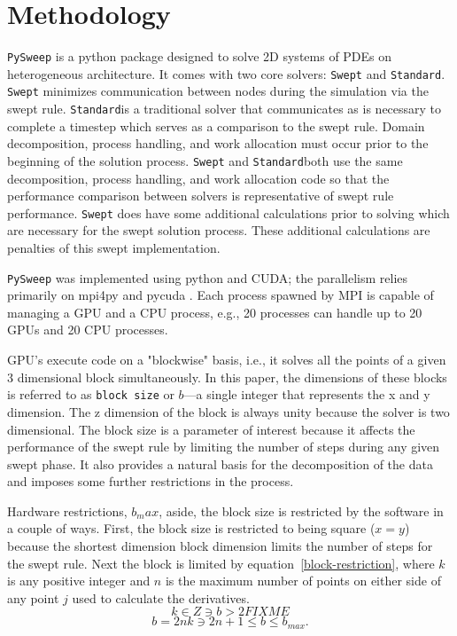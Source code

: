 \documentclass[review]{elsarticle}
\def\pysweep{\texttt{PySweep}}
\def\Swept{\texttt{Swept}}
\def\Standard{\texttt{Standard}}
\begin{document}
%
%

\section{Methodology}
\pysweep{} is a python package designed to solve 2D systems of PDEs on heterogeneous architecture. It comes with two core solvers: \Swept{} and \Standard{}. \Swept{} minimizes communication between nodes during the simulation via the swept rule. \Standard is a traditional solver that communicates as is necessary to complete a timestep which serves as a comparison to the swept rule. Domain decomposition, process handling, and work allocation must occur prior to the beginning of the solution process. \Swept{} and \Standard both use the same decomposition, process handling, and work allocation code so that the performance comparison between solvers is representative of swept rule performance. \Swept{} does have some additional calculations prior to solving which are necessary for the swept solution process. These additional calculations are penalties of this swept implementation. 

\par
\pysweep{} was implemented using python and CUDA; the parallelism relies primarily on mpi4py and pycuda \cite{DalcinMPIPython, KlocknerPyCUDAGeneration}. Each process spawned by MPI is capable of managing a GPU and a CPU process, e.g., 20 processes can handle up to 20 GPUs and 20 CPU processes. 

\par
GPU's execute code on a "blockwise" basis, i.e., it solves all the points of a given 3 dimensional block simultaneously. In this paper, the dimensions of these blocks is referred to as \texttt{block size} or $b$---a single integer that represents the x and y dimension. The z dimension of the block is always unity because the solver is two dimensional. The block size is a parameter of interest because it affects the performance of the swept rule by limiting the number of steps during any given swept phase. It also provides a natural basis for the decomposition of the data and imposes some further restrictions in the process.

\par 
Hardware restrictions, $b_max$, aside, the block size is restricted by the software in a couple of ways. First, the block size is restricted to being square ($x=y$) because the shortest dimension block dimension limits the number of steps for the swept rule. Next the block is limited by equation~\ref{block-restriction}, where $k$ is any positive integer and $n$ is the maximum number of points on either side of any point $j$ used to calculate the derivatives.
\begin{equation}
  \label{k-restriction}
  k \in Z \ni b > 2 FIX ME 
\end{equation}
\begin{equation}
\label{block-restriction}
    b  = 2nk \ni 2n+1 \leq b \leq b_{max}.
\end{equation}
\end{document}
